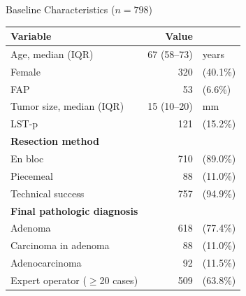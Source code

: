 \documentclass[aspectratio=169,10pt]{beamer}
\begin{document}
\begin{frame}{Baseline Characteristics ($n = 798$)}
\begin{center}
\small
\begin{tabular}{@{}lrl@{}}
\toprule
\textbf{Variable} & \textbf{Value} & \\
\midrule
Age, median (IQR) & 67 (58--73) & years \\
Female & 320 & (40.1\%) \\
FAP & 53 & (6.6\%) \\
Tumor size, median (IQR) & 15 (10--20) & mm \\
LST-p & 121 & (15.2\%) \\
\midrule
\textbf{Resection method} & & \\
\quad En bloc & 710 & (89.0\%) \\
\quad Piecemeal & 88 & (11.0\%) \\
Technical success & 757 & (94.9\%) \\
\midrule
\textbf{Final pathologic diagnosis} & & \\
\quad Adenoma & 618 & (77.4\%) \\
\quad Carcinoma in adenoma & 88 & (11.0\%) \\
\quad Adenocarcinoma & 92 & (11.5\%) \\
\midrule
Expert operator ($\geq$20 cases) & 509 & (63.8\%) \\
\bottomrule
\end{tabular}
\end{center}
\end{frame}
\end{document}
